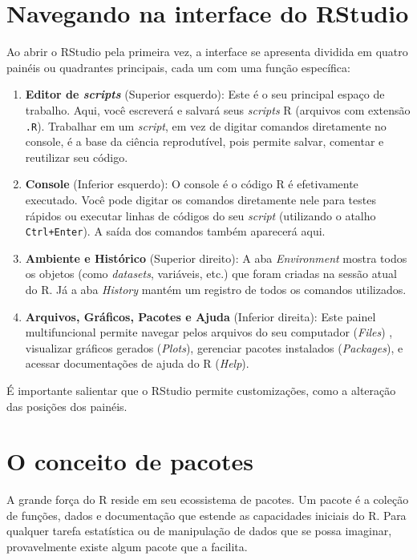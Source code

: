 \documentclass[
  12pt,
  letterpaper,
  DIV=11,
  numbers=noendperiod]{scrreprt}
\providecommand{\tightlist}{%
  \setlength{\itemsep}{0pt}\setlength{\parskip}{0pt}}\usepackage{longtable,booktabs,array}
\begin{document}
\section{Navegando na interface do
RStudio}\label{navegando-na-interface-do-rstudio}

Ao abrir o RStudio pela primeira vez, a interface se apresenta dividida
em quatro painéis ou quadrantes principais, cada um com uma função
específica:

\begin{enumerate}
\def\labelenumi{\arabic{enumi}.}
\tightlist
\item
  \textbf{Editor de \emph{scripts}} (Superior esquerdo): Este é o seu
  principal espaço de trabalho. Aqui, você escreverá e salvará seus
  \emph{scripts} R (arquivos com extensão \texttt{.R}). Trabalhar em um
  \emph{script}, em vez de digitar comandos diretamente no console, é a
  base da ciência reprodutível, pois permite salvar, comentar e
  reutilizar seu código.
\item
  \textbf{Console} (Inferior esquerdo): O console é o código R é
  efetivamente executado. Você pode digitar os comandos diretamente nele
  para testes rápidos ou executar linhas de códigos do seu \emph{script}
  (utilizando o atalho \texttt{Ctrl+Enter}). A saída dos comandos também
  aparecerá aqui.
\item
  \textbf{Ambiente e Histórico} (Superior direito): A aba
  \emph{Environment} mostra todos os objetos (como \emph{datasets},
  variáveis, etc.) que foram criadas na sessão atual do R. Já a aba
  \emph{History} mantém um registro de todos os comandos utilizados.
\item
  \textbf{Arquivos, Gráficos, Pacotes e Ajuda} (Inferior direita): Este
  painel multifuncional permite navegar pelos arquivos do seu computador
  (\emph{Files}) , visualizar gráficos gerados (\emph{Plots}), gerenciar
  pacotes instalados (\emph{Packages}), e acessar documentações de ajuda
  do R (\emph{Help}).
\end{enumerate}

É importante salientar que o RStudio permite customizações, como a
alteração das posições dos painéis.

\section{O conceito de pacotes}\label{o-conceito-de-pacotes}

A grande força do R reside em seu ecossistema de pacotes. Um pacote é a
coleção de funções, dados e documentação que estende as capacidades
iniciais do R. Para qualquer tarefa estatística ou de manipulação de
dados que se possa imaginar, provavelmente existe algum pacote que a
facilita.
\end{document}
